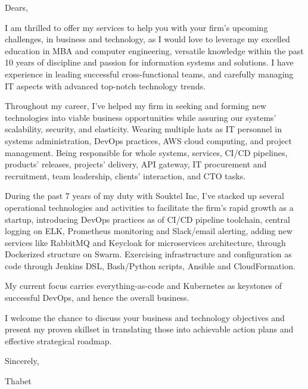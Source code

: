 \vspace{20mm}
\vspace{10mm}


\begin{cvletter}

Dears,

I am thrilled to offer my services to help you with your firm’s upcoming challenges, in business and technology, as I would love to leverage my excelled education in MBA and computer engineering, versatile knowledge within the past 10 years of discipline and passion for information systems and solutions. I have experience in leading successful cross-functional teams, and carefully managing IT aspects with advanced top-notch technology trends.

Throughout my career, I've helped my firm in seeking and forming new technologies into viable business opportunities while assuring our systems’ scalability, security, and elasticity. Wearing multiple hats as IT personnel in systems administration, DevOps practices, AWS cloud computing, and project management. Being responsible for whole systems, services, CI/CD pipelines, products' releases, projects' delivery, API gateway, IT procurement and recruitment, team leadership, clients' interaction, and CTO tasks.

During the past 7 years of my duty with Souktel Inc, I've stacked up several operational technologies and activities to facilitate the firm's rapid growth as a startup, introducing DevOps practices as of CI/CD pipeline toolchain, central logging on ELK, Prometheus monitoring and Slack/email alerting, adding new services like RabbitMQ and Keycloak for microservices architecture, through Dockerized structure on Swarm. Exercising infrastructure and configuration as code through Jenkins DSL, Bash/Python scripts, Ansible and CloudFormation.

My current focus carries everything-as-code and Kubernetes as keystones of successful DevOps, and hence the overall business.

I welcome the chance to discuss your business and technology objectives and present my proven skillset in translating those into achievable action plans and effective strategical roadmap.

Sincerely,

Thabet
\end{cvletter}

